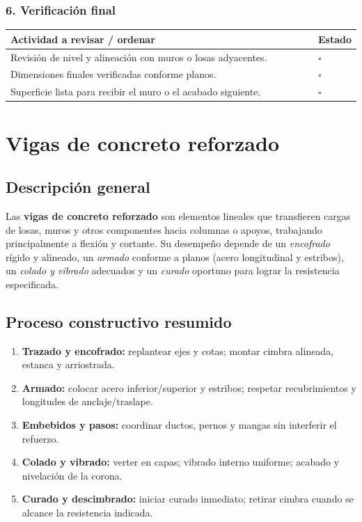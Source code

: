 \documentclass[12pt]{article}
\newcommand{\cbox}{\(\square\)}
\renewcommand{\cbox}{\(\square\)} %
\begin{document}
	\subsubsection*{6. Verificación final}
	\begin{tabularx}{\linewidth}{>{\raggedright\arraybackslash}p{0.93\linewidth} >{\centering\arraybackslash}m{0.07\linewidth}}
		\toprule
		\textbf{Actividad a revisar / ordenar} & \textbf{Estado}\\
		\midrule
		Revisión de nivel y alineación con muros o losas adyacentes. & \cbox \\
		Dimensiones finales verificadas conforme planos. & \cbox \\
		Superficie lista para recibir el muro o el acabado siguiente. & \cbox \\
		\bottomrule
	\end{tabularx}
	
	
	
	
	
	
	
	
	
	
	\section{Vigas de concreto reforzado}
	
	\subsection*{Descripción general}
	Las \textbf{vigas de concreto reforzado} son elementos lineales que transfieren cargas de losas, muros y otros componentes hacia columnas o apoyos, trabajando principalmente a flexión y cortante. Su desempeño depende de un \emph{encofrado} rígido y alineado, un \emph{armado} conforme a planos (acero longitudinal y estribos), un \emph{colado y vibrado} adecuados y un \emph{curado} oportuno para lograr la resistencia especificada.
	
	\subsection*{Proceso constructivo resumido}
	\begin{enumerate}[leftmargin=*, itemsep=2pt]
		\item \textbf{Trazado y encofrado:} replantear ejes y cotas; montar cimbra alineada, estanca y arriostrada.
		\item \textbf{Armado:} colocar acero inferior/superior y estribos; respetar recubrimientos y longitudes de anclaje/traslape.
		\item \textbf{Embebidos y pasos:} coordinar ductos, pernos y mangas sin interferir el refuerzo.
		\item \textbf{Colado y vibrado:} verter en capas; vibrado interno uniforme; acabado y nivelación de la corona.
		\item \textbf{Curado y descimbrado:} iniciar curado inmediato; retirar cimbra cuando se alcance la resistencia indicada.
	\end{enumerate}
	
\end{document}
